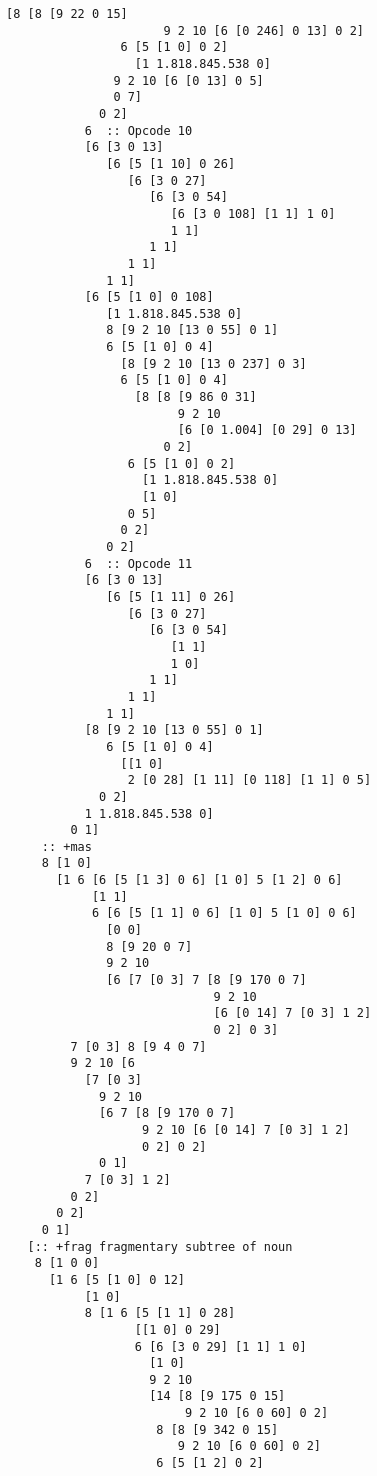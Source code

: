 \documentclass[twoside]{article}
\begin{document}
\begin{lstlisting}[style=listingcode]
                [8 [8 [9 22 0 15]
                      9 2 10 [6 [0 246] 0 13] 0 2]
                6 [5 [1 0] 0 2]
                  [1 1.818.845.538 0]
               9 2 10 [6 [0 13] 0 5]
               0 7]
             0 2]
           6  :: Opcode 10
           [6 [3 0 13]
              [6 [5 [1 10] 0 26]
                 [6 [3 0 27]
                    [6 [3 0 54]
                       [6 [3 0 108] [1 1] 1 0]
                       1 1]
                    1 1]
                 1 1]
              1 1]
           [6 [5 [1 0] 0 108]
              [1 1.818.845.538 0]
              8 [9 2 10 [13 0 55] 0 1]
              6 [5 [1 0] 0 4]
                [8 [9 2 10 [13 0 237] 0 3]
                6 [5 [1 0] 0 4]
                  [8 [8 [9 86 0 31]
                        9 2 10
                        [6 [0 1.004] [0 29] 0 13]
                      0 2]
                 6 [5 [1 0] 0 2]
                   [1 1.818.845.538 0]
                   [1 0]
                 0 5]
                0 2]
              0 2]
           6  :: Opcode 11
           [6 [3 0 13]
              [6 [5 [1 11] 0 26]
                 [6 [3 0 27]
                    [6 [3 0 54]
                       [1 1]
                       1 0]
                    1 1]
                 1 1]
              1 1]
           [8 [9 2 10 [13 0 55] 0 1]
              6 [5 [1 0] 0 4]
                [[1 0]
                 2 [0 28] [1 11] [0 118] [1 1] 0 5]
             0 2]
           1 1.818.845.538 0]
         0 1]
     :: +mas
     8 [1 0]
       [1 6 [6 [5 [1 3] 0 6] [1 0] 5 [1 2] 0 6]
            [1 1]
            6 [6 [5 [1 1] 0 6] [1 0] 5 [1 0] 0 6]
              [0 0]
              8 [9 20 0 7]
              9 2 10
              [6 [7 [0 3] 7 [8 [9 170 0 7]
                             9 2 10
                             [6 [0 14] 7 [0 3] 1 2]
                             0 2] 0 3]
         7 [0 3] 8 [9 4 0 7]
         9 2 10 [6
           [7 [0 3]
             9 2 10
             [6 7 [8 [9 170 0 7]
                   9 2 10 [6 [0 14] 7 [0 3] 1 2]
                   0 2] 0 2]
             0 1]
           7 [0 3] 1 2]
         0 2]
       0 2]
     0 1]
   [:: +frag fragmentary subtree of noun
    8 [1 0 0]
      [1 6 [5 [1 0] 0 12]
           [1 0]
           8 [1 6 [5 [1 1] 0 28]
                  [[1 0] 0 29]
                  6 [6 [3 0 29] [1 1] 1 0]
                    [1 0]
                    9 2 10
                    [14 [8 [9 175 0 15]
                         9 2 10 [6 0 60] 0 2]
                     8 [8 [9 342 0 15]
                        9 2 10 [6 0 60] 0 2]
                     6 [5 [1 2] 0 2]

\end{lstlisting}
\end{document}
